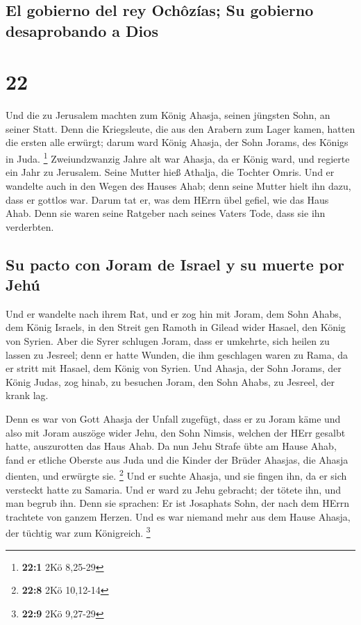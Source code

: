\hypertarget{el-gobierno-del-rey-ochuxf4zuxedas-su-gobierno-desaprobando-a-dios}{%
\subsection{El gobierno del rey Ochôzías; Su gobierno desaprobando a
Dios}\label{el-gobierno-del-rey-ochuxf4zuxedas-su-gobierno-desaprobando-a-dios}}

\hypertarget{section-21}{%
\section{22}\label{section-21}}

 Und die zu Jerusalem machten zum König Ahasja, seinen
jüngsten Sohn, an seiner Statt. Denn die Kriegsleute, die aus den
Arabern zum Lager kamen, hatten die ersten alle erwürgt; darum ward
König Ahasja, der Sohn Jorams, des Königs in Juda. \footnote{\textbf{22:1}
  2Kö 8,25-29}  Zweiundzwanzig Jahre alt war Ahasja, da er
König ward, und regierte ein Jahr zu Jerusalem. Seine Mutter hieß
Athalja, die Tochter Omris.  Und er wandelte auch in den
Wegen des Hauses Ahab; denn seine Mutter hielt ihn dazu, dass er gottlos
war.  Darum tat er, was dem HErrn übel gefiel, wie das
Haus Ahab. Denn sie waren seine Ratgeber nach seines Vaters Tode, dass
sie ihn verderbten.

\hypertarget{su-pacto-con-joram-de-israel-y-su-muerte-por-jehuxfa}{%
\subsection{Su pacto con Joram de Israel y su muerte por
Jehú}\label{su-pacto-con-joram-de-israel-y-su-muerte-por-jehuxfa}}

 Und er wandelte nach ihrem Rat, und er zog hin mit Joram,
dem Sohn Ahabs, dem König Israels, in den Streit gen Ramoth in Gilead
wider Hasael, den König von Syrien. Aber die Syrer schlugen Joram,
 dass er umkehrte, sich heilen zu lassen zu Jesreel; denn
er hatte Wunden, die ihm geschlagen waren zu Rama, da er stritt mit
Hasael, dem König von Syrien. Und Ahasja, der Sohn Jorams, der König
Judas, zog hinab, zu besuchen Joram, den Sohn Ahabs, zu Jesreel, der
krank lag.

 Denn es war von Gott Ahasja der Unfall zugefügt, dass er
zu Joram käme und also mit Joram auszöge wider Jehu, den Sohn Nimsis,
welchen der HErr gesalbt hatte, auszurotten das Haus Ahab.
 Da nun Jehu Strafe übte am Hause Ahab, fand er etliche
Oberste aus Juda und die Kinder der Brüder Ahasjas, die Ahasja dienten,
und erwürgte sie. \footnote{\textbf{22:8} 2Kö 10,12-14} 
Und er suchte Ahasja, und sie fingen ihn, da er sich versteckt hatte zu
Samaria. Und er ward zu Jehu gebracht; der tötete ihn, und man begrub
ihn. Denn sie sprachen: Er ist Josaphats Sohn, der nach dem HErrn
trachtete von ganzem Herzen. Und es war niemand mehr aus dem Hause
Ahasja, der tüchtig war zum Königreich. \footnote{\textbf{22:9} 2Kö
  9,27-29}

